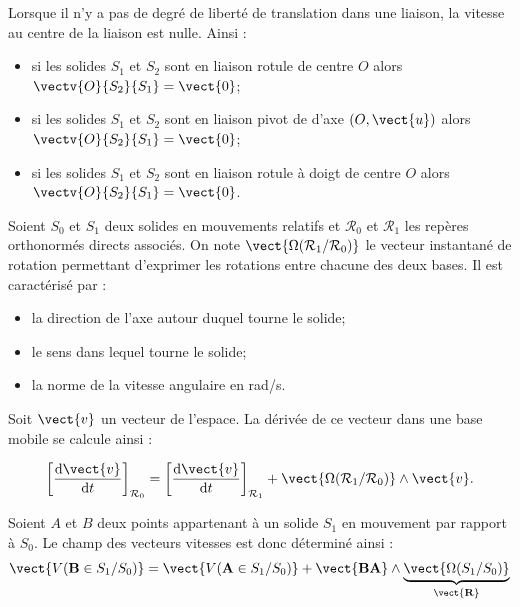 
%


\begin{resultat}
Lorsque il n'y a pas de degré de liberté de translation dans une liaison, la vitesse au centre de la liaison est nulle. Ainsi : 
\begin{itemize}
\item si les solides $S_1$ et $S_2$ sont en liaison rotule de centre $O$ alors $\vectv{O}{S_2}{S_1}=\vect{0}$;
\item si les solides $S_1$ et $S_2$ sont en liaison pivot de d'axe $\left(O,\vect{u}\right)$ alors $\vectv{O}{S_2}{S_1}=\vect{0}$;
\item si les solides $S_1$ et $S_2$ sont en liaison rotule à doigt de centre $O$ alors $\vectv{O}{S_2}{S_1}=\vect{0}$.
\end{itemize}
\end{resultat}



\begin{defi} 
Soient $S_0$ et $S_1$ deux solides en mouvements relatifs et $\mathcal{R}_0$ et $\mathcal{R}_1$ les repères orthonormés directs associés.  On note $\vect{\Omega(\mathcal{R}_1/\mathcal{R}_0)}$ le vecteur instantané de rotation permettant d'exprimer les rotations entre chacune des deux bases. Il est caractérisé par : 
\begin{itemize}
\item la direction de l'axe autour duquel tourne le solide;
\item le sens dans lequel tourne le solide;
\item la norme de la vitesse angulaire en \si{rad/s}.
\end{itemize}
\end{defi}

\begin{resultat}

Soit $\vect{v}$ un vecteur de l'espace. La dérivée de ce vecteur dans une base mobile se calcule ainsi :

$$
\left[\dfrac{\text{d}\vect{v}}{\text{d}t}\right]_{\mathcal{R}_0} =
\left[\dfrac{\text{d}\vect{v}}{\text{d}t}\right]_{\mathcal{R}_1} 
+ \vect{\Omega(\mathcal{R}_1/\mathcal{R}_0)}\wedge \vect{v}.
$$
\end{resultat}


\begin{resultat}

Soient $A$ et $B$ deux points appartenant à un solide $S_1$ en mouvement par rapport à $S_0$. Le champ des vecteurs vitesses est donc déterminé ainsi :
$$
\vect{V(\mathbf{B}\in S_1/S_0)} = \vect{V(\mathbf{A}\in S_1/S_0)} + \vect{\mathbf{BA}}\wedge \underbrace{\vect{\Omega(S_1/S_0)}}_{\mathbf{\vect{R}}}
$$

\end{resultat}



